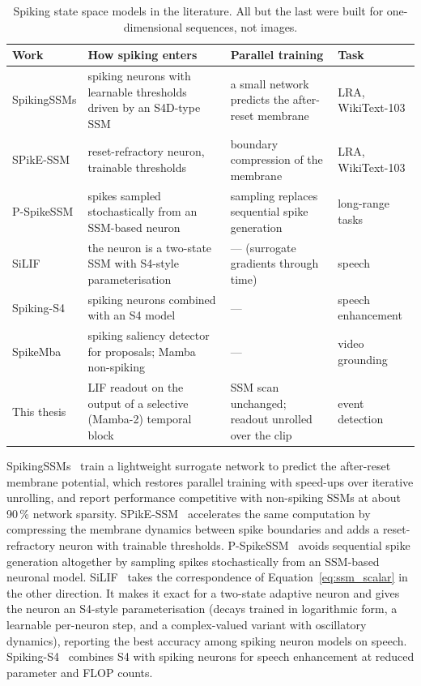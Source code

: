 \documentclass[11pt, a4paper]{report}
\begin{document}
\begin{table}[htbp]
\centering
\small
\caption[Spiking state space models]{Spiking state space models in the literature. All but the last were built for one-dimensional sequences, not
    images.}
\label{tab:spiking_ssm}
\begin{tabularx}{\textwidth}{@{}l>{\raggedright\arraybackslash}X>{\raggedright\arraybackslash}Xl@{}}
\toprule
\textbf{Work} & \textbf{How spiking enters} & \textbf{Parallel training} & \textbf{Task} \\
\midrule
SpikingSSMs \cite{shen2025spikingssms} & spiking neurons with learnable thresholds driven by an S4D-type SSM &
  a small network predicts the after-reset membrane & LRA, WikiText-103 \\
SPikE-SSM \cite{zhong2024spike} & reset-refractory neuron, trainable thresholds & boundary compression of
  the membrane & LRA, WikiText-103 \\
P-SpikeSSM \cite{bal2025p} & spikes sampled stochastically from an SSM-based neuron & sampling replaces
  sequential spike generation & long-range tasks \\
SiLIF \cite{fabre2025silif} & the neuron is a two-state SSM with S4-style parameterisation & --- (surrogate
  gradients through time) & speech \\
Spiking-S4 \cite{du2023spiking} & spiking neurons combined with an S4 model & --- & speech enhancement \\
SpikeMba \cite{li2024spikemba} & spiking saliency detector for proposals; Mamba non-spiking & --- &
  video grounding \\
\midrule
This thesis & LIF readout on the output of a selective (Mamba-2) temporal block & SSM scan unchanged;
  readout unrolled over the clip & event detection \\
\bottomrule
\end{tabularx}
\end{table}

SpikingSSMs~\cite{shen2025spikingssms} train a lightweight surrogate network to predict the
after-reset membrane potential, which restores parallel training with speed-ups over
iterative unrolling, and report performance competitive with non-spiking SSMs at about 90\,\% network
sparsity. SPikE-SSM~\cite{zhong2024spike} accelerates the same computation by compressing the membrane
dynamics between spike boundaries and adds a reset-refractory neuron with trainable thresholds.
P-SpikeSSM~\cite{bal2025p} avoids sequential spike generation altogether by sampling spikes stochastically
from an SSM-based neuronal model. SiLIF~\cite{fabre2025silif} takes the correspondence of
Equation~\eqref{eq:ssm_scalar} in the other direction. It makes it exact for a two-state adaptive neuron and
gives the neuron an S4-style parameterisation (decays trained in logarithmic form, a learnable per-neuron step,
and a complex-valued variant with oscillatory dynamics), reporting the best accuracy among spiking neuron models on speech. Spiking-S4~\cite{du2023spiking} combines S4 with spiking neurons for speech
enhancement at reduced parameter and FLOP counts.
\end{document}
